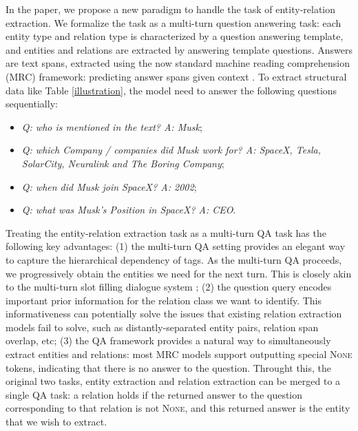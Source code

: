 \documentclass[11pt,a4paper]{article}
\newenvironment{tightitemize}{\begin{itemize}[topsep=0pt, partopsep=0pt] \setlength{\itemsep}{0pt}\setlength{\parskip}{0pt}}{\end{itemize}}
\begin{document}
In the paper, we propose a  new paradigm to handle the task of entity-relation extraction. We formalize the task as a multi-turn question answering task: 
each entity type and relation type is characterized by a question answering template, and entities and relations are extracted by answering template questions. 
Answers  are text spans, extracted using the now 
standard machine reading comprehension (MRC) framework: predicting answer spans given context \cite{seo2016bidirectional,wang2016machine,xiong2017dcn,wang2016multi}. 
To extract structural data like Table \ref{illustration}, the model need to answer the following questions sequentially:
\begin{tightitemize}
\item {\it Q: who is mentioned in the text? A: Musk};
\item {\it Q: which Company / companies did Musk work for?  A: SpaceX, Tesla, SolarCity, Neuralink and The Boring Company}; 
\item {\it Q: when did Musk join SpaceX?  A: 2002};
\item  {\it Q: what was Musk's Position in SpaceX?  A: CEO}.
\end{tightitemize}



Treating the entity-relation extraction task as a multi-turn QA task has the following key advantages: 
(1) the multi-turn QA setting provides an elegant way to capture the hierarchical dependency of tags. As the multi-turn QA proceeds, we progressively obtain the entities we need for the next turn. This is closely akin to the multi-turn slot filling dialogue system \cite{williams2005scaling,lemon2006isu};
(2) the question query encodes important prior information for the 
relation
 class we want to identify.  This informativeness can potentially solve the issues that existing relation extraction models fail to solve, such as distantly-separated entity pairs,  relation span overlap, etc; 
  (3) the QA framework provides a  natural way to simultaneously extract entities and relations:  
most MRC models support outputting special  \textsc{None} tokens, indicating that there is no answer to the question. 
Throught this, the original two tasks, entity extraction and relation extraction 
 can be merged to a single QA task: 
a relation 
holds if the returned answer to the question corresponding to that relation 
 is not \textsc{None}, and this returned answer is the entity that we wish to extract.  
\end{document}

